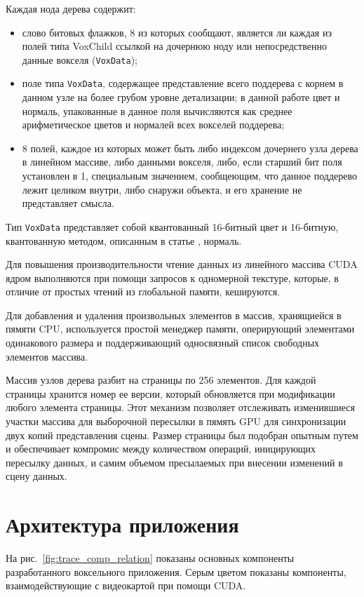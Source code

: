\documentclass[a4paper,14pt]{extreport}
\begin{document}
	Каждая нода дерева содержит:
\begin{itemize}
\item слово битовых флажков, 8 из которых сообщают, является ли каждая из полей типа VoxChild ссылкой на дочернюю ноду или непосредственно данные вокселя (\texttt{VoxData});
\item поле типа \texttt{VoxData}, содержащее представление всего поддерева с корнем в данном узле на более грубом уровне детализации; в данной работе цвет и нормаль, упакованные в данное поля вычисляются как среднее арифметическое цветов и нормалей всех вокселей поддерева;
\item 8 полей, каждое из которых может быть либо индексом дочернего узла дерева в линейном массиве, либо данными вокселя, либо, если старший бит поля установлен в 1, специальным значением, сообщеющим, что данное поддерево лежит целиком внутри, либо снаружи объекта, и его хранение не представляет смысла.
\end{itemize}

Тип \texttt{VoxData} представляет собой квантованный 16-битный цвет и 16-битную, квантованную методом, описанным в статье \cite{quant_normals}, нормаль. 

Для повышения производительности чтение данных из линейного массива CUDA ядром выполняются при помощи запросов к одномерной текстуре, которые, в отличие от простых чтений из глобальной памяти, кешируются.

Для добавления и удаления произвольных элементов в массив, хранящиейся в пямяти CPU, используется простой менеджер памяти, оперирующий элементами одинакового размера и поддерживающий односвязный список свободных элементов массива.

Массив узлов дерева разбит на страницы по 256 элементов. Для каждой страницы хранится номер ее версии, который обновляется при модификации любого элемента страницы. Этот механизм позволяет отслеживать изменившиеся участки массива для выборочной пересылки в пямять GPU для синхронизации двух копий представления сцены. Размер страницы был подобран опытным путем и обеспечивает компромис между количеством операций, иницирующих пересылку данных, и самим объемом пресылаемых при внесении изменений в сцену данных.

\section{Архитектура приложения}
На рис.~\ref{fig:trace_comp_relation} показаны основных компоненты разработанного воксельного приложения. Серым цветом показаны компоненты, взаимодействующие с видеокартой при помощи CUDA.
\end{document}

